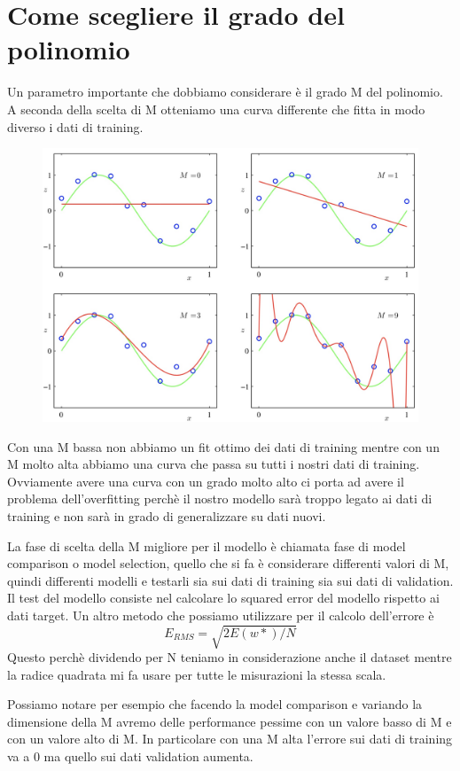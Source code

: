 \documentclass[14pt]{extreport}
\begin{document}
\section{Come scegliere il grado del polinomio}

Un parametro importante che dobbiamo considerare è il grado M del polinomio. A seconda della scelta di M otteniamo una curva differente che fitta in
modo diverso i dati di training.

\begin{figure}[H]
\centering
\includegraphics[width=0.7\linewidth]{83.jpeg}
\end{figure}

Con una M bassa non abbiamo un fit ottimo dei dati di training mentre con un M molto alta abbiamo una curva che passa su tutti i nostri dati di
training. Ovviamente avere una curva con un grado molto alto ci porta ad avere il problema dell'overfitting perchè il nostro modello sarà troppo
legato ai dati di training e non sarà in grado di generalizzare su dati nuovi.

La fase di scelta della M migliore per il modello è chiamata fase di model comparison o model selection, quello che si fa è considerare differenti
valori di M, quindi differenti modelli e testarli sia sui dati di training sia sui dati di validation. Il test del modello consiste nel calcolare lo
squared error del modello rispetto ai dati target. Un altro metodo che possiamo utilizzare per il calcolo dell'errore è $$E_{RMS} = \sqrt{2E(w*)/N}$$
Questo perchè dividendo per N teniamo in considerazione anche il dataset mentre la radice quadrata mi fa usare per tutte le misurazioni la stessa
scala.

Possiamo notare per esempio che facendo la model comparison e variando la dimensione della M avremo delle performance pessime con un valore basso di M
e con un valore alto di M. In particolare con una M alta l'errore sui dati di training va a 0 ma quello sui dati validation aumenta.
\end{document}
